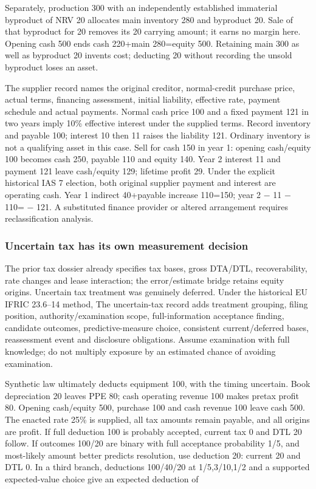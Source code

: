 Separately, production 300 with an independently established immaterial byproduct of NRV 20 allocates main inventory 280 and byproduct 20. Sale of that byproduct for 20 removes its 20 carrying amount; it earns no margin here. Opening cash 500 ends cash 220+main 280=equity 500. Retaining main 300 as well as byproduct 20 invents cost; deducting 20 without recording the unsold byproduct loses an asset.

The supplier record names the original creditor, normal-credit purchase price, actual terms, financing assessment, initial liability, effective rate, payment schedule and actual payments. Normal cash price 100 and a fixed payment 121 in two years imply 10\% effective interest under the supplied terms. Record inventory and payable 100; interest 10 then 11 raises the liability 121. Ordinary inventory is not a qualifying asset in this case. Sell for cash 150 in year 1: opening cash/equity 100 becomes cash 250, payable 110 and equity 140. Year 2 interest 11 and payment 121 leave cash/equity 129; lifetime profit 29. Under the explicit historical IAS 7 election, both original supplier payment and interest are operating cash. Year 1 indirect 40+payable increase 110=150; year 2 − 11 − 110= − 121. A substituted finance provider or altered arrangement requires reclassification analysis.

\hypertarget{uncertain-tax-has-its-own-measurement-decision}{%
\subsubsection{Uncertain tax has its own measurement decision}\label{uncertain-tax-has-its-own-measurement-decision}}

The prior tax dossier already specifies tax bases, gross DTA/DTL, recoverability, rate changes and lease interaction; the error/estimate bridge retains equity origins. Uncertain tax treatment was genuinely deferred. Under the historical EU IFRIC 23.6--14 method, The uncertain-tax record adds treatment grouping, filing position, authority/examination scope, full-information acceptance finding, candidate outcomes, predictive-measure choice, consistent current/deferred bases, reassessment event and disclosure obligations. Assume examination with full knowledge; do not multiply exposure by an estimated chance of avoiding examination.

Synthetic law ultimately deducts equipment 100, with the timing uncertain. Book depreciation 20 leaves PPE 80; cash operating revenue 100 makes pretax profit 80. Opening cash/equity 500, purchase 100 and cash revenue 100 leave cash 500. The enacted rate 25\% is supplied, all tax amounts remain payable, and all origins are profit. If full deduction 100 is probably accepted, current tax 0 and DTL 20 follow. If outcomes 100/20 are binary with full acceptance probability 1/5, and most-likely amount better predicts resolution, use deduction 20: current 20 and DTL 0. In a third branch, deductions 100/40/20 at 1/5,3/10,1/2 and a supported expected-value choice give an expected deduction of

